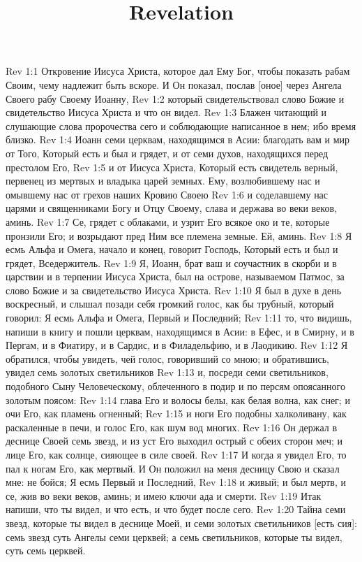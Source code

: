 

\title{Revelation}

Rev 1:1  Откровение Иисуса Христа, которое дал Ему Бог, чтобы показать рабам Своим, чему надлежит быть вскоре. И Он показал, послав [оное] через Ангела Своего рабу Своему Иоанну,
Rev 1:2  который свидетельствовал слово Божие и свидетельство Иисуса Христа и что он видел.
Rev 1:3  Блажен читающий и слушающие слова пророчества сего и соблюдающие написанное в нем; ибо время близко.
Rev 1:4  Иоанн семи церквам, находящимся в Асии: благодать вам и мир от Того, Который есть и был и грядет, и от семи духов, находящихся перед престолом Его,
Rev 1:5  и от Иисуса Христа, Который есть свидетель верный, первенец из мертвых и владыка царей земных. Ему, возлюбившему нас и омывшему нас от грехов наших Кровию Своею
Rev 1:6  и соделавшему нас царями и священниками Богу и Отцу Своему, слава и держава во веки веков, аминь.
Rev 1:7  Се, грядет с облаками, и узрит Его всякое око и те, которые пронзили Его; и возрыдают пред Ним все племена земные. Ей, аминь.
Rev 1:8  Я есмь Альфа и Омега, начало и конец, говорит Господь, Который есть и был и грядет, Вседержитель.
Rev 1:9  Я, Иоанн, брат ваш и соучастник в скорби и в царствии и в терпении Иисуса Христа, был на острове, называемом Патмос, за слово Божие и за свидетельство Иисуса Христа.
Rev 1:10  Я был в духе в день воскресный, и слышал позади себя громкий голос, как бы трубный, который говорил: Я есмь Альфа и Омега, Первый и Последний;
Rev 1:11  то, что видишь, напиши в книгу и пошли церквам, находящимся в Асии: в Ефес, и в Смирну, и в Пергам, и в Фиатиру, и в Сардис, и в Филадельфию, и в Лаодикию.
Rev 1:12  Я обратился, чтобы увидеть, чей голос, говоривший со мною; и обратившись, увидел семь золотых светильников
Rev 1:13  и, посреди семи светильников, подобного Сыну Человеческому, облеченного в подир и по персям опоясанного золотым поясом:
Rev 1:14  глава Его и волосы белы, как белая волна, как снег; и очи Его, как пламень огненный;
Rev 1:15  и ноги Его подобны халколивану, как раскаленные в печи, и голос Его, как шум вод многих.
Rev 1:16  Он держал в деснице Своей семь звезд, и из уст Его выходил острый с обеих сторон меч; и лице Его, как солнце, сияющее в силе своей.
Rev 1:17  И когда я увидел Его, то пал к ногам Его, как мертвый. И Он положил на меня десницу Свою и сказал мне: не бойся; Я есмь Первый и Последний,
Rev 1:18  и живый; и был мертв, и се, жив во веки веков, аминь; и имею ключи ада и смерти.
Rev 1:19  Итак напиши, что ты видел, и что есть, и что будет после сего.
Rev 1:20  Тайна семи звезд, которые ты видел в деснице Моей, и семи золотых светильников [есть сия]: семь звезд суть Ангелы семи церквей; а семь светильников, которые ты видел, суть семь церквей.
